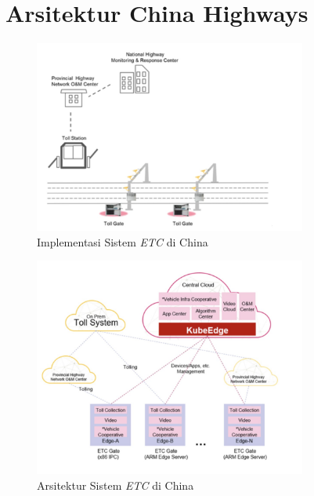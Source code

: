 \chapter{Arsitektur China Highways}

\begin{figure}[ht]
  \centering
  \includegraphics[width=0.8\textwidth]{resources/chapter-2/china-highways.jpg}
  \caption{Implementasi Sistem \textit{ETC} di China \parencite{penelitianterkait1}}
  \label{fig:china-highways}
\end{figure}

\begin{figure}[ht]
  \includegraphics[width=0.8\textwidth]{resources/chapter-2/arsitektur-china-highways.jpg}
  \caption{Arsitektur Sistem \textit{ETC} di China \parencite{penelitianterkait1}}
  \label{fig:architecture-china-highways}
\end{figure}